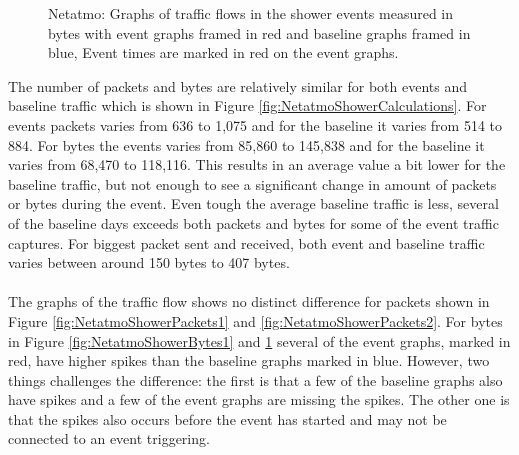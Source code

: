 \begin{figure}[H]
\begin{subfigure}[b]{0.47\textwidth}
    \end{subfigure}
        \begin{subfigure}[b]{0.47\textwidth}
        \centering
    \end{subfigure}
    \begin{subfigure}[b]{0.47\textwidth}
        \centering
    \end{subfigure}
    \begin{subfigure}[b]{0.47\textwidth}
        \centering
    \end{subfigure}
    \hspace{0.6cm}
    \begin{subfigure}[b]{0.47\textwidth}
    \centering
        \end{subfigure}
    \caption{Netatmo: Graphs of traffic flows in the shower events measured in bytes with event graphs framed in red and baseline graphs framed in blue, Event times are marked in red on the event graphs.}    
    \label{fig:NetatmoShowerBytes2}
\end{figure}

The number of packets and bytes are relatively similar for both events and baseline traffic which is shown in Figure \ref{fig:NetatmoShowerCalculations}. For events packets varies from 636 to 1,075 and for the baseline it varies from 514 to 884. For bytes the events varies from 85,860 to 145,838 and for the baseline it varies from 68,470 to 118,116. This results in an average value a bit lower for the baseline traffic, but not enough to see a significant change in amount of packets or bytes during the event. Even tough the average baseline traffic is less, several of the baseline days exceeds both packets and bytes for some of the event traffic captures. For biggest packet sent and received, both event and baseline traffic varies between around 150 bytes to 407 bytes. 
\\\\
The graphs of the traffic flow shows no distinct difference for packets shown in Figure \ref{fig:NetatmoShowerPackets1} and \ref{fig:NetatmoShowerPackets2}. For bytes in Figure \ref{fig:NetatmoShowerBytes1} and \ref{fig:NetatmoShowerBytes2} several of the event graphs, marked in red, have higher spikes than the baseline graphs marked in blue. However, two things challenges the difference: the first is that a few of the baseline graphs also have spikes and a few of the event graphs are missing the spikes. The other one is that the spikes also occurs before the event has started and may not be connected to an event triggering. 

